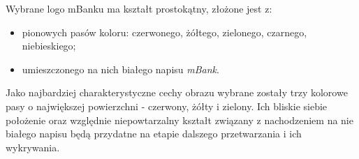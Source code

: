 Wybrane logo mBanku ma kształt prostokątny, złożone jest z:
\begin{itemize}
    \item pionowych pasów koloru: czerwonego, żółtego, zielonego, czarnego, niebieskiego;
    \item umieszczonego na nich białego napisu \emph{mBank}.
\end{itemize}

Jako najbardziej charakterystyczne cechy obrazu wybrane zostały trzy kolorowe pasy o największej powierzchni - czerwony, żółty i zielony. Ich bliskie siebie położenie oraz względnie niepowtarzalny kształt związany z nachodzeniem na nie białego napisu będą przydatne na etapie dalszego przetwarzania i ich wykrywania.


